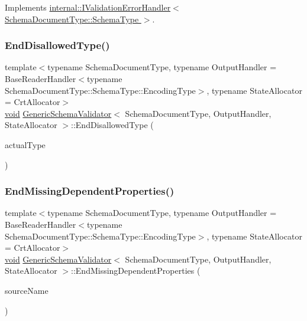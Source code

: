 Implements \hyperlink{classinternal_1_1IValidationErrorHandler_a817c1e3e9cc62603997a2fcdc564820b}{internal\+::\+I\+Validation\+Error\+Handler$<$ Schema\+Document\+Type\+::\+Schema\+Type $>$}.

\mbox{\label{classGenericSchemaValidator_ae0f99bfee3e2021c05322fd5d6de2f6e}} 
\subsubsection{\texorpdfstring{End\+Disallowed\+Type()}{EndDisallowedType()}}
{\footnotesize\ttfamily template$<$typename Schema\+Document\+Type, typename Output\+Handler = Base\+Reader\+Handler$<$typename Schema\+Document\+Type\+::\+Schema\+Type\+::\+Encoding\+Type$>$, typename State\+Allocator = Crt\+Allocator$>$ \\
\hyperlink{imgui__impl__opengl3__loader_8h_ac668e7cffd9e2e9cfee428b9b2f34fa7}{void} \hyperlink{classGenericSchemaValidator}{Generic\+Schema\+Validator}$<$ Schema\+Document\+Type, Output\+Handler, State\+Allocator $>$\+::End\+Disallowed\+Type (\begin{DoxyParamCaption}\item[{const typename Schema\+Type\+::\+Value\+Type \&}]{actual\+Type }\end{DoxyParamCaption})\hspace{0.3cm}{\ttfamily [inline]}}

\mbox{\label{classGenericSchemaValidator_afdcd2ff7b5f7e24f4f3d6976fa5b803e}} 
\subsubsection{\texorpdfstring{End\+Missing\+Dependent\+Properties()}{EndMissingDependentProperties()}}
{\footnotesize\ttfamily template$<$typename Schema\+Document\+Type, typename Output\+Handler = Base\+Reader\+Handler$<$typename Schema\+Document\+Type\+::\+Schema\+Type\+::\+Encoding\+Type$>$, typename State\+Allocator = Crt\+Allocator$>$ \\
\hyperlink{imgui__impl__opengl3__loader_8h_ac668e7cffd9e2e9cfee428b9b2f34fa7}{void} \hyperlink{classGenericSchemaValidator}{Generic\+Schema\+Validator}$<$ Schema\+Document\+Type, Output\+Handler, State\+Allocator $>$\+::End\+Missing\+Dependent\+Properties (\begin{DoxyParamCaption}\item[{const \hyperlink{classGenericSchemaValidator_a3c004e35c7eb9fa5a28c0ccfb8ac62dc}{S\+Value} \&}]{source\+Name }\end{DoxyParamCaption})\hspace{0.3cm}{\ttfamily [inline]}}

